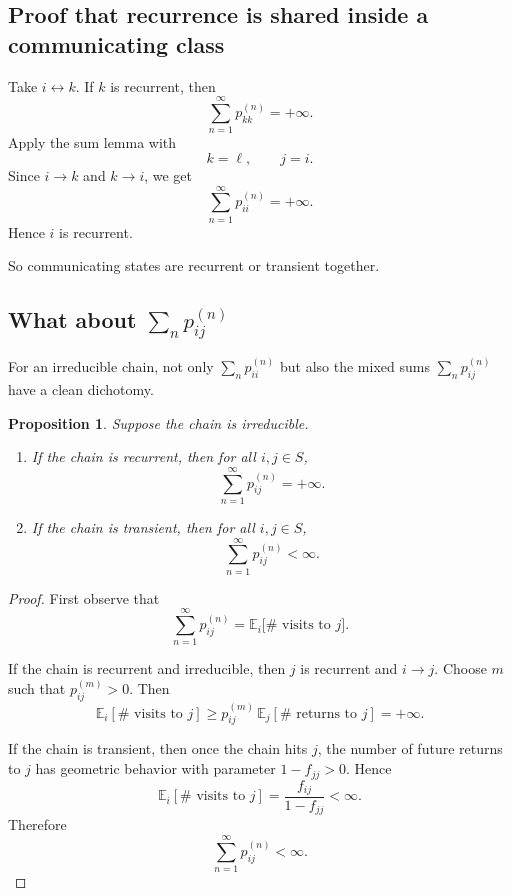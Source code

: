 \documentclass[11pt]{article}
\newtheorem{proposition}[theorem]{Proposition}
\theoremstyle{definition}
\begin{document}
\subsection{Proof that recurrence is shared inside a communicating class}

Take \(i\leftrightarrow k\). If \(k\) is recurrent, then
\[
\sum_{n=1}^\infty p_{kk}^{(n)}=+\infty.
\]
Apply the sum lemma with
\[
k=\ell,
\qquad
j=i.
\]
Since \(i\to k\) and \(k\to i\), we get
\[
\sum_{n=1}^\infty p_{ii}^{(n)}=+\infty.
\]
Hence \(i\) is recurrent.

So communicating states are recurrent or transient together.

\subsection[What about the sum of n-step transition probabilities?]{What about \texorpdfstring{$\sum_n p_{ij}^{(n)}$}{the sum of n-step transition probabilities?}}

For an irreducible chain, not only \(\sum_n p_{ii}^{(n)}\) but also the mixed sums \(\sum_n p_{ij}^{(n)}\) have a clean dichotomy.

\begin{proposition}
Suppose the chain is irreducible.
\begin{enumerate}[label=(\roman*)]
    \item If the chain is recurrent, then for all \(i,j\in S\),
    \[
    \sum_{n=1}^\infty p_{ij}^{(n)}=+\infty.
    \]
    \item If the chain is transient, then for all \(i,j\in S\),
    \[
    \sum_{n=1}^\infty p_{ij}^{(n)}<\infty.
    \]
\end{enumerate}
\end{proposition}

\begin{proof}
First observe that
\[
\sum_{n=1}^\infty p_{ij}^{(n)}
=
\mathbb E_i\!\bigl[\#\text{ visits to } j\bigr].
\]

If the chain is recurrent and irreducible, then \(j\) is recurrent and \(i\to j\). Choose \(m\) such that \(p_{ij}^{(m)}>0\). Then
\[
\mathbb E_i[\#\text{ visits to } j]
\ge
p_{ij}^{(m)}\,\mathbb E_j[\#\text{ returns to } j]
=
+\infty.
\]

If the chain is transient, then once the chain hits \(j\), the number of future returns to \(j\) has geometric behavior with parameter \(1-f_{jj}>0\). Hence
\[
\mathbb E_i[\#\text{ visits to } j]
=
\frac{f_{ij}}{1-f_{jj}}
<\infty.
\]
Therefore
\[
\sum_{n=1}^\infty p_{ij}^{(n)}<\infty.
\]
\end{proof}
\end{document}
